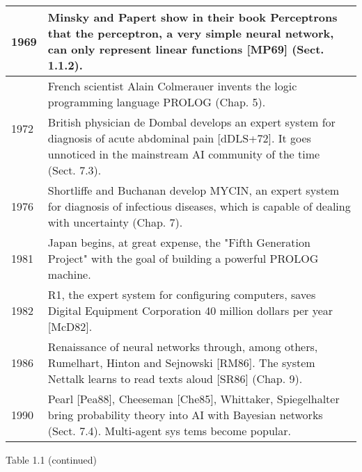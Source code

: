 \documentclass[10pt]{article}
\begin{document}
\begin{center}
\begin{tabular}{|l|l|}
\hline
1969 & Minsky and Papert show in their book Perceptrons that the perceptron, a very simple neural network, can only represent linear functions [MP69] (Sect. 1.1.2). \\
\hline
\multirow[t]{2}{*}{1972} & French scientist Alain Colmerauer invents the logic programming language PROLOG (Chap. 5). \\
\hline
 & British physician de Dombal develops an expert system for diagnosis of acute abdominal pain [dDLS+72]. It goes unnoticed in the mainstream AI community of the time (Sect. 7.3). \\
\hline
1976 & Shortliffe and Buchanan develop MYCIN, an expert system for diagnosis of infectious diseases, which is capable of dealing with uncertainty (Chap. 7). \\
\hline
1981 & Japan begins, at great expense, the "Fifth Generation Project" with the goal of building a powerful PROLOG machine. \\
\hline
1982 & R1, the expert system for configuring computers, saves Digital Equipment Corporation 40 million dollars per year [McD82]. \\
\hline
1986 & Renaissance of neural networks through, among others, Rumelhart, Hinton and Sejnowski [RM86]. The system Nettalk learns to read texts aloud [SR86] (Chap. 9). \\
\hline
1990 & Pearl [Pea88], Cheeseman [Che85], Whittaker, Spiegelhalter bring probability theory into AI with Bayesian networks (Sect. 7.4). Multi-agent sys
tems become popular. \\
\hline
\end{tabular}
\end{center}

Table 1.1 (continued)
\end{document}
